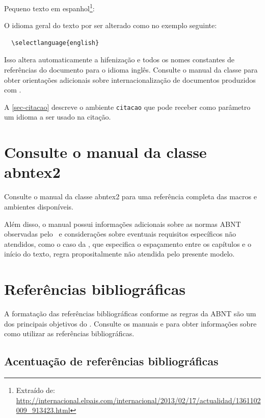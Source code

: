 Pequeno texto em espanhol\footnote{Extraído de:
\url{http://internacional.elpais.com/internacional/2013/02/17/actualidad/1361102009_913423.html}}:


O idioma geral do texto por ser alterado como no exemplo seguinte:

\begin{verbatim}
  \selectlanguage{english}
\end{verbatim}

Isso altera automaticamente a hifenização e todos os nomes constantes de
referências do documento para o idioma inglês. Consulte o manual da classe
\cite{abntex2classe} para obter orientações adicionais sobre internacionalização de
documentos produzidos com \abnTeX.

A \autoref{sec-citacao} descreve o ambiente \texttt{citacao} que pode receber
como parâmetro um idioma a ser usado na citação.

\section{Consulte o manual da classe \textsf{abntex2}}

Consulte o manual da classe \textsf{abntex2} \cite{abntex2classe} para uma
referência completa das macros e ambientes disponíveis. 

Além disso, o manual possui informações adicionais sobre as normas ABNT
observadas pelo \abnTeX\ e considerações sobre eventuais requisitos específicos
não atendidos, como o caso da \textcite{NBR14724:2011}, que
especifica o espaçamento entre os capítulos e o início do texto, regra
propositalmente não atendida pelo presente modelo.

\section{Referências bibliográficas}

A formatação das referências bibliográficas conforme as regras da ABNT são um
dos principais objetivos do \abnTeX. Consulte os manuais
\textcite{abntex2cite} e \textcite{abntex2cite-alf} para obter informações
sobre como utilizar as referências bibliográficas.

\subsection{Acentuação de referências bibliográficas}

